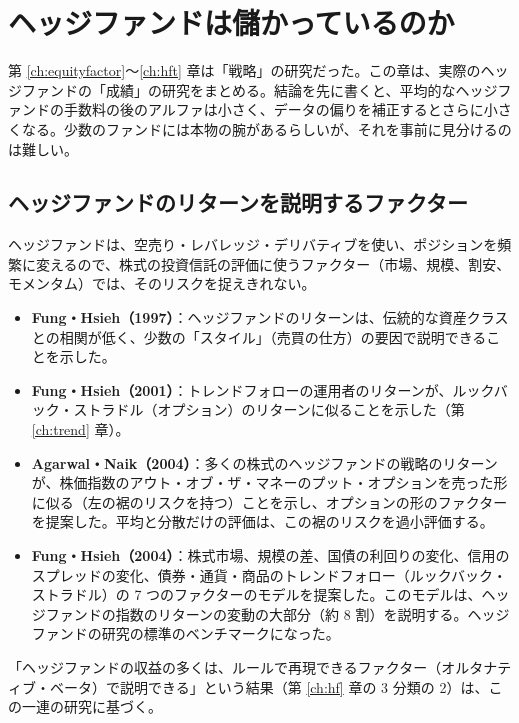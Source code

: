 \chapter{ヘッジファンドは儲かっているのか}
\label{ch:hfperf}

第 \ref{ch:equityfactor}〜\ref{ch:hft} 章は「戦略」の研究だった。この章は、実際のヘッジファンドの「成績」の研究をまとめる。結論を先に書くと、平均的なヘッジファンドの手数料の後のアルファは小さく、データの偏りを補正するとさらに小さくなる。少数のファンドには本物の腕があるらしいが、それを事前に見分けるのは難しい。

\section{ヘッジファンドのリターンを説明するファクター}

ヘッジファンドは、空売り・レバレッジ・デリバティブを使い、ポジションを頻繁に変えるので、株式の投資信託の評価に使うファクター（市場、規模、割安、モメンタム）では、そのリスクを捉えきれない。

\begin{itemize}
\item \textbf{Fung・Hsieh（1997）}\cite{funghsieh1997}：ヘッジファンドのリターンは、伝統的な資産クラスとの相関が低く、少数の「スタイル」（売買の仕方）の要因で説明できることを示した。
\item \textbf{Fung・Hsieh（2001）}\cite{funghsieh2001}：トレンドフォローの運用者のリターンが、ルックバック・ストラドル（オプション）のリターンに似ることを示した（第 \ref{ch:trend} 章）。
\item \textbf{Agarwal・Naik（2004）}\cite{agarwalnaik2004}：多くの株式のヘッジファンドの戦略のリターンが、株価指数のアウト・オブ・ザ・マネーのプット・オプションを売った形に似る（左の裾のリスクを持つ）ことを示し、オプションの形のファクターを提案した。平均と分散だけの評価は、この裾のリスクを過小評価する。
\item \textbf{Fung・Hsieh（2004）}\cite{funghsieh2004}：株式市場、規模の差、国債の利回りの変化、信用のスプレッドの変化、債券・通貨・商品のトレンドフォロー（ルックバック・ストラドル）の 7 つのファクターのモデルを提案した。このモデルは、ヘッジファンドの指数のリターンの変動の大部分（約 8 割）を説明する。ヘッジファンドの研究の標準のベンチマークになった。
\end{itemize}

\begin{projbox}
「ヘッジファンドの収益の多くは、ルールで再現できるファクター（オルタナティブ・ベータ）で説明できる」という結果（第 \ref{ch:hf} 章の 3 分類の 2）は、この一連の研究に基づく。
\end{projbox}

